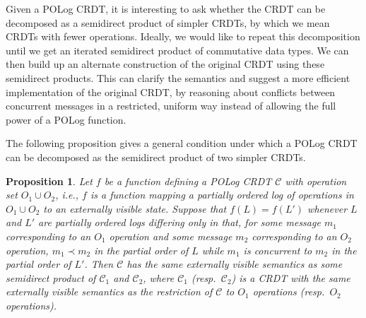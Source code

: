 \documentclass[acmsmall,nonacm]{acmart}
\newcommand{\mc}[1]{\ensuremath{\mathcal{#1}}}
\theoremstyle{plain}
\newtheorem{myprop}[mythm]{Proposition}
\theoremstyle{definition}
\begin{document}
Given a POLog CRDT, it is interesting to ask whether the CRDT can be decomposed as a semidirect product of simpler CRDTs, by which we mean CRDTs with fewer operations.  Ideally, we would like to repeat this decomposition until we get an iterated semidirect product of commutative data types.  We can then build up an alternate construction of the original CRDT using these semidirect products.  This can clarify the semantics and suggest a more efficient implementation of the original CRDT, by reasoning about conflicts between concurrent messages in a restricted, uniform way instead of allowing the full power of a POLog function.

The following proposition gives a general condition under which a POLog CRDT can be decomposed as the semidirect product of two simpler CRDTs.
\begin{myprop}
Let $f$ be a function defining a POLog CRDT $\mc{C}$ with operation set $O_1 \cup O_2$, i.e., $f$ is a function mapping a partially ordered log of operations in $O_1 \cup O_2$ to an externally visible state.  Suppose that $f(L) = f(L')$ whenever $L$ and $L'$ are partially ordered logs differing only in that, for some message $m_1$ corresponding to an $O_1$ operation and some message $m_2$ corresponding to an $O_2$ operation, $m_1 \prec m_2$ in the partial order of $L$ while $m_1$ is concurrent to $m_2$ in the partial order of $L'$.  Then $\mc{C}$ has the same externally visible semantics as some semidirect product of $\mc{C}_1$ and $\mc{C}_2$, where $\mc{C}_1$ (resp.\ $\mc{C}_2$) is a CRDT with the same externally visible semantics as the restriction of $\mc{C}$ to $O_1$ operations (resp.\ $O_2$ operations).
\end{myprop}
\end{document}
